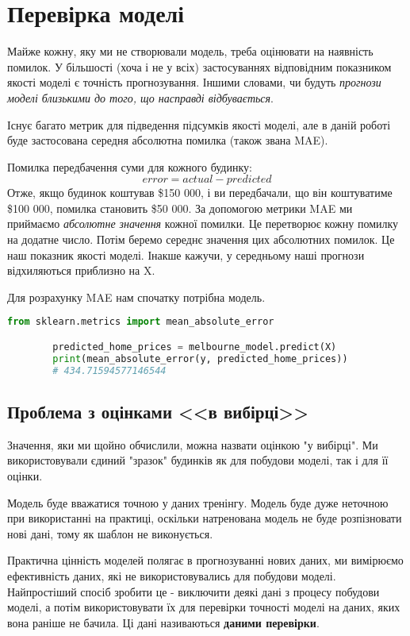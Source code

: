 \chapter{Перевірка моделі}\label{cha:model_validation}
Майже кожну, яку ми не створювали модель, треба оцінювати на наявність помилок.
У більшості (хоча і не у всіх) застосуваннях відповідним показником якості моделі є точність прогнозування.
Іншими словами, чи будуть \textit{прогнози моделі близькими до того, що насправді відбувається}.

Існує багато метрик для підведення підсумків якості моделі, але в даній роботі буде застосована середня абсолютна помилка (також звана MAE).

Помилка передбачення суми для кожного будинку:
\[error=actual-predicted\]
Отже, якщо будинок коштував \$150 000, і ви передбачали, що він коштуватиме \$100 000, помилка становить \$50 000.
За допомогою метрики MAE ми приймаємо \textit{абсолютне значення} кожної помилки.
Це перетворює кожну помилку на додатне число.
Потім беремо середнє значення цих абсолютних помилок.
Це наш показник якості моделі.
Інакше кажучи, у середньому наші прогнози відхиляються приблизно на X.

Для розрахунку MAE нам спочатку потрібна модель.

\begin{lstlisting}[style=light, language=Python,label={lst:vectorimg},caption=Розрахунок середньої абсолютної похибки]
        from sklearn.metrics import mean_absolute_error

        predicted_home_prices = melbourne_model.predict(X)
        print(mean_absolute_error(y, predicted_home_prices))
        # 434.71594577146544
\end{lstlisting}

\section{Проблема з оцінками <<в вибірці>>}\label{sec:in_sample_problem}
Значення, яки ми щойно обчислили, можна назвати оцінкою "у вибірці".
Ми використовували єдиний "зразок" будинків як для побудови моделі, так і для її оцінки.

Модель буде вважатися точною у даних тренінгу.
Модель буде дуже неточною при використанні на практиці, оскільки натренована модель не буде розпізновати нові дані, тому як шаблон не виконується.

Практична цінність моделей полягає в прогнозуванні нових даних, ми вимірюємо ефективність даних, які не використовувались для побудови моделі.
Найпростіший спосіб зробити це - виключити деякі дані з процесу побудови моделі, а потім використовувати їх для перевірки точності моделі на даних, яких вона раніше не бачила.
Ці дані називаються \textbf{даними перевірки}.

